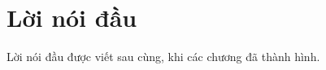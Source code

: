 \chapter{Lời nói đầu}
\label{ch:loi-noi-dau}

Lời nói đầu được viết sau cùng, khi các chương đã thành hình.
